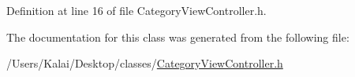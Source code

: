 Definition at line 16 of file Category\-View\-Controller.\-h.



The documentation for this class was generated from the following file\-:\begin{DoxyCompactItemize}
\item 
/\-Users/\-Kalai/\-Desktop/classes/\hyperlink{_category_view_controller_8h}{Category\-View\-Controller.\-h}\end{DoxyCompactItemize}
